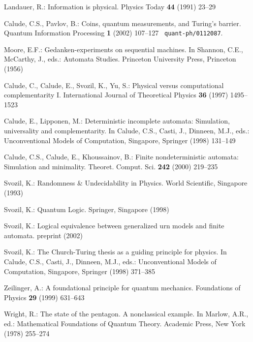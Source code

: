 \documentclass{llncs}
\begin{document}
\begin{thebibliography}{10}

Landauer, R.:
\newblock Information is physical.
\newblock Physics Today \textbf{44} (1991)  23--29

Calude, C.S., Pavlov, B.:
\newblock Coins, quantum measurements, and {T}uring's barrier.
\newblock Quantum Information Processing \textbf{1} (2002)  107--127 {\tt
  quant-ph/0112087}.

Moore, E.F.:
\newblock Gedanken-experiments on sequential machines.
\newblock In Shannon, C.E., McCarthy, J., eds.: Automata Studies.
\newblock Princeton University Press, Princeton (1956)

Calude, C., Calude, E., Svozil, K., Yu, S.:
\newblock Physical versus computational complementarity {I}.
\newblock International Journal of Theoretical Physics \textbf{36} (1997)
  1495--1523

Calude, E., Lipponen, M.:
\newblock Deterministic incomplete automata: Simulation, universality and
  complementarity.
\newblock In Calude, C.S., Casti, J., Dinneen, M.J., eds.: Unconventional
  Models of Computation, Singapore, Springer (1998)  131--149

Calude, C.S., Calude, E., Khoussainov, B.:
\newblock Finite nondeterministic automata: {S}imulation and minimality.
\newblock Theoret. Comput. Sci. \textbf{242} (2000)  219--235

Svozil, K.:
\newblock Randomness \& Undecidability in Physics.
\newblock World Scientific, Singapore (1993)

Svozil, K.:
\newblock Quantum Logic.
\newblock Springer, Singapore (1998)

Svozil, K.:
\newblock Logical equivalence between generalized urn models and finite
  automata.
\newblock preprint (2002)

Svozil, K.:
\newblock The {C}hurch-{T}uring thesis as a guiding principle for physics.
\newblock In Calude, C.S., Casti, J., Dinneen, M.J., eds.: Unconventional
  Models of Computation, Singapore, Springer (1998)  371--385

Zeilinger, A.:
\newblock A foundational principle for quantum mechanics.
\newblock Foundations of Physics \textbf{29} (1999)  631--643

Wright, R.:
\newblock The state of the pentagon. {A} nonclassical example.
\newblock In Marlow, A.R., ed.: Mathematical Foundations of Quantum Theory.
\newblock Academic Press, New York (1978)  255--274


\end{thebibliography}
\end{document}
